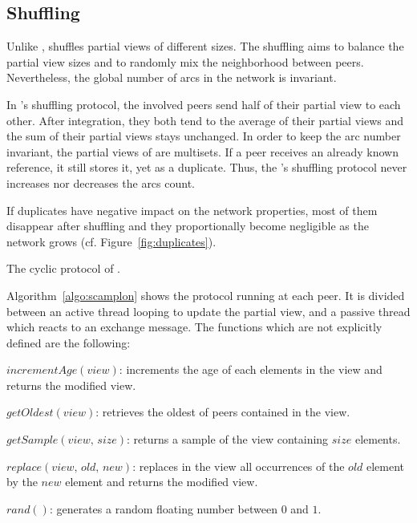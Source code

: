 \subsection{Shuffling}
\label{subsec:cyclic}

Unlike \CYCLON, \SPRAY shuffles partial views of different sizes. The shuffling
aims to balance the partial view sizes and to randomly mix the neighborhood
between peers. Nevertheless, the global number of arcs in the network is
invariant.

In \SPRAY's shuffling protocol, the involved peers send half of their partial
view to each other. After integration, they both tend to the average of their
partial views and the sum of their partial views stays unchanged. In order to
keep the arc number invariant, the partial views of \SPRAY are multisets. If a
peer receives an already known reference, it still stores it, yet as a
duplicate. Thus, the \SPRAY's shuffling protocol never increases nor decreases
the arcs count.

If duplicates have negative impact on the network properties, most of them
disappear after shuffling and they proportionally become negligible as the
network grows (cf. Figure~\ref{fig:duplicates}).

\begin{algorithm}[h]
  
  \caption{\label{algo:scamplon}The cyclic protocol of \SPRAY.}
\end{algorithm}

Algorithm~\ref{algo:scamplon} shows the \SPRAY protocol running at each
peer. It is divided between an active thread looping to update the partial
view, and a passive thread which reacts to an exchange message. The functions
which are not explicitly defined are the following:
\begin{compactitem}
\item $incrementAge(view)$: increments the age of each elements in the view
  and returns the modified view.
\item $getOldest(view)$: retrieves the oldest of peers contained in the view.
\item $getSample(view, \, size)$: returns a sample of the view containing
  $size$ elements.
\item $replace(view,\,old,\,new)$: replaces in the view all occurrences of
  the $old$ element by the $new$ element and returns the modified view.
\item $rand()$: generates a random floating number between $0$ and $1$.
\end{compactitem}

